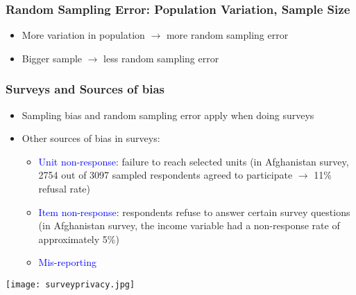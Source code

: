 \documentclass{beamer}
\newcommand{\blue}{\textcolor{blue}}
\begin{document}
\begin{frame}
 \frametitle<+->{Random Sampling Error: Population Variation, Sample Size}
 \begin{minipage}{.38\linewidth}
 \begin{itemize}
   \item<2-> More variation in population  $\rightarrow$ more random sampling error
   \item<5-> Bigger sample $\rightarrow$ less random sampling error
 \end{itemize}
 \end{minipage}\hfill
 \begin{minipage}{.58\linewidth}
 \end{minipage}
\end{frame}

\begin{frame}
 \frametitle<+->{Surveys and Sources of bias}
 \begin{minipage}{.58\linewidth}
 \begin{itemize}[<+->]
   \item Sampling bias and random sampling error apply when doing surveys
   \item Other sources of bias in surveys:
     \begin{itemize}
       \item \blue{Unit non-response}: failure to reach selected units (in Afghanistan survey, 2754 out of 3097 sampled respondents agreed to participate $\rightarrow$ 11\% refusal rate)
       \item \blue{Item non-response}:  respondents refuse to answer certain survey questions (in Afghanistan survey, the income variable had a non-response rate of approximately 5\%)
       \item \blue{Mis-reporting}
     \end{itemize}
 \end{itemize}
 \end{minipage}\hfill
 \begin{minipage}{.38\linewidth}
 \texttt{[image: surveyprivacy.jpg]}
 \end{minipage}
\end{frame}
\end{document}

